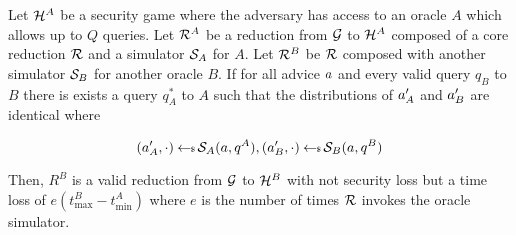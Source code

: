 \begin{lemma}
\label{oracle-sub}

Let $\mathcal{H}^{A}$ be a security game where the adversary has access to an oracle $A$ which allows up to $Q$ queries.
Let $\mathcal{R}^{A}$ be a reduction from $\mathcal{G}$ to $\mathcal{H}^{A}$ composed of a core reduction $\mathcal{R}$ and a simulator $\mathcal{S}_{A}$ for $A$.
Let $\mathcal{R}^{B}$ be $\mathcal{R}$ composed with another simulator $\mathcal{S}_{B}$ for another oracle $B$.
If for all advice $a$ and every valid query $q_{B}$ to $B$ there is exists a query $q_{A}^*$ to $A$ such that the distributions of $a'_{A}$ and $a'_{B}$ are identical where

\[ (a'_A, \cdot) \hskip2.3pt{\gets\!\!\mbox{\tiny${\$}$\normalsize}}\, \mathcal{S}_A(a, q^A) , (a'_B, \cdot) \hskip2.3pt{\gets\!\!\mbox{\tiny${\$}$\normalsize}}\, \mathcal{S}_B(a, q^B) \]

Then, $R^{B}$ is a valid reduction from $\mathcal{G}$ to $\mathcal{H}^{B}$ with not security loss but a time loss of $e(t^{B}_{\max} - t^{A}_{\min})$ where $e$ is the number of times $\mathcal{R}$ invokes the oracle simulator.
\end{lemma}

